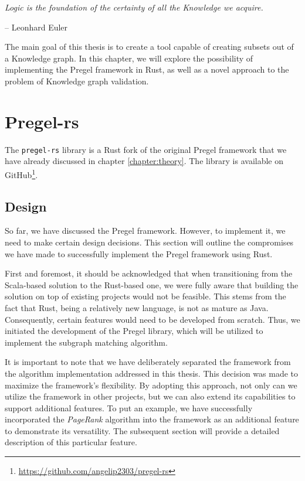 \epigraph{\textit{Logic is the foundation of the certainty of all the Knowledge we acquire.}}{-- \textup{Leonhard Euler}}

The main goal of this thesis is to create a tool capable of creating subsets out of a Knowledge graph. In this chapter, we will explore the possibility of implementing the Pregel framework in Rust, as well as a novel approach to the problem of Knowledge graph validation.

\section{Pregel-rs}

The \texttt{pregel-rs} library is a Rust fork of the original Pregel framework that we have already discussed in chapter \ref{chapter:theory}. The library is available on GitHub\footnote{\url{https://github.com/angelip2303/pregel-rs}}.

\subsection{Design}

So far, we have discussed the Pregel framework. However, to implement it, we need to make certain design decisions. This section will outline the compromises we have made to successfully implement the Pregel framework using Rust.

First and foremost, it should be acknowledged that when transitioning from the Scala-based solution to the Rust-based one, we were fully aware that building the solution on top of existing projects would not be feasible. This stems from the fact that Rust, being a relatively new language, is not as mature as Java. Consequently, certain features would need to be developed from scratch. Thus, we initiated the development of the Pregel library, which will be utilized to implement the subgraph matching algorithm.

It is important to note that we have deliberately separated the framework from the algorithm implementation addressed in this thesis. This decision was made to maximize the framework's flexibility. By adopting this approach, not only can we utilize the framework in other projects, but we can also extend its capabilities to support additional features. To put an example, we have successfully incorporated the \textit{PageRank} algorithm into the framework as an additional feature to demonstrate its versatility. The subsequent section will provide a detailed description of this particular feature.

